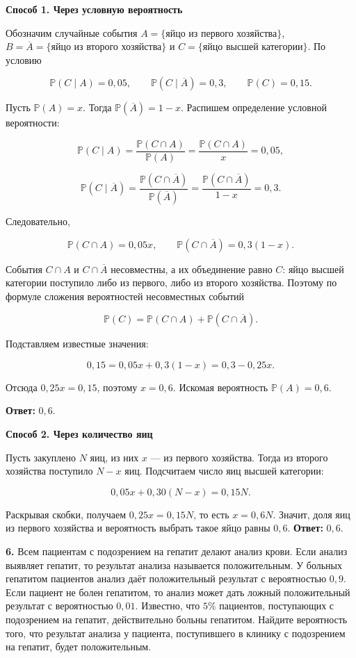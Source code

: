 \begin{solution}\label{solution-problem-solving-practice-problems-5}
\textbf{Способ 1. Через условную вероятность}

Обозначим случайные события $A=\{\text{яйцо из первого хозяйства}\}$, $B=\overline A=\{\text{яйцо из второго хозяйства}\}$ и $C=\{\text{яйцо высшей категории}\}$. По условию

\[\mathbb P(C\mid A)=0{,}05,\qquad \mathbb P(C\mid\overline A)=0{,}3,\qquad \mathbb P(C)=0{,}15.\]

Пусть $\mathbb P(A)=x$. Тогда $\mathbb P(\overline A)=1-x$. Распишем определение условной вероятности:

\[\mathbb P(C\mid A)=\frac{\mathbb P(C\cap A)}{\mathbb P(A)}=\frac{\mathbb P(C\cap A)}{x}=0{,}05,\]

\[\mathbb P(C\mid\overline A)=\frac{\mathbb P(C\cap\overline A)}{\mathbb P(\overline A)}=\frac{\mathbb P(C\cap\overline A)}{1-x}=0{,}3.\]

Следовательно,

\[\mathbb P(C\cap A)=0{,}05x,\qquad \mathbb P(C\cap\overline A)=0{,}3(1-x).\]

События $C\cap A$ и $C\cap\overline A$ несовместны, а их объединение равно $C$: яйцо высшей категории поступило либо из первого, либо из второго хозяйства. Поэтому по формуле сложения вероятностей несовместных событий

\[\mathbb P(C)=\mathbb P(C\cap A)+\mathbb P(C\cap\overline A).\]

Подставляем известные значения:

\[0{,}15=0{,}05x+0{,}3(1-x)=0{,}3-0{,}25x.\]

Отсюда $0{,}25x=0{,}15$, поэтому $x=0{,}6$. Искомая вероятность $\mathbb P(A)=0{,}6$.

\textbf{Ответ:} $0{,}6$.

\textbf{Способ 2. Через количество яиц}

Пусть закуплено $N$ яиц, из них $x$ — из первого хозяйства. Тогда из второго хозяйства поступило $N-x$ яиц. Подсчитаем число яиц высшей категории:

\[0{,}05x+0{,}30(N-x)=0{,}15N.\]

Раскрывая скобки, получаем $0{,}25x=0{,}15N$, то есть $x=0{,}6N$. Значит, доля яиц из первого хозяйства и вероятность выбрать такое яйцо равны $0{,}6$. \textbf{Ответ:} $0{,}6$.
\end{solution}

\begin{task}\label{task-problems-6}
\textbf{6.} Всем пациентам с подозрением на гепатит делают анализ крови. Если анализ выявляет гепатит, то результат анализа называется положительным. У больных гепатитом пациентов анализ даёт положительный результат с вероятностью $0,9$. Если пациент не болен гепатитом, то анализ может дать ложный положительный результат с вероятностью $0,01$. Известно, что $5\%$ пациентов, поступающих с подозрением на гепатит, действительно больны гепатитом. Найдите вероятность того, что результат анализа у пациента, поступившего в клинику с подозрением на гепатит, будет положительным.
\end{task}

